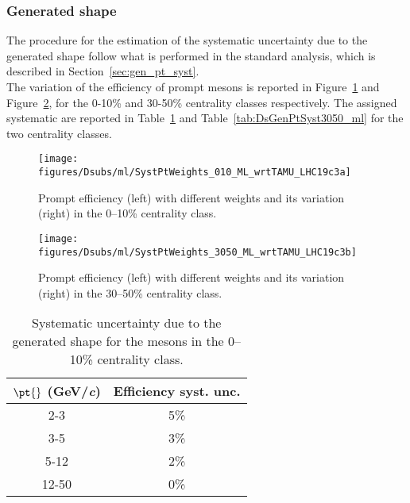 \subsubsection{Generated \pt{} shape}
The procedure for the estimation of the systematic uncertainty due to the generated \pt{} shape follow what is performed 
in the standard analysis, which is described in Section~\ref{sec:gen_pt_syst}. \\
The variation of the efficiency of prompt \Dsubs{} mesons is reported in Figure~\ref{fig:genpt_010} and Figure~\ref{fig:genpt_3050}, for the 0-10\% 
and 30-50\% centrality classes respectively.
The assigned systematic are reported in Table~\ref{tab:DsGenPtSyst010_ml} and Table~\ref{tab:DsGenPtSyst3050_ml} for the two centrality classes.
\begin{figure}[htbp]
  \begin{center}
   \texttt{[image: figures/Dsubs/ml/SystPtWeights\_010\_ML\_wrtTAMU\_LHC19c3a]}
  \caption{Prompt \Dsubs{} efficiency (left) with different \pt{} weights and its variation (right) in the 0--10\% centrality
           class.}
  \label{fig:genpt_010}
  \end{center}
\end{figure}
\begin{figure}[htbp]
  \begin{center}
   \texttt{[image: figures/Dsubs/ml/SystPtWeights\_3050\_ML\_wrtTAMU\_LHC19c3b]}
  \caption{Prompt \Dsubs{} efficiency (left) with different \pt{} weights and its variation (right) in the 30--50\% centrality
           class.}
  \label{fig:genpt_3050}
  \end{center}
\end{figure}
\begin{table}[htbp]
  \begin{center}
   \begin{tabular}{|c|c|}
    \hline
    \textbf{$\mathbf{\pt{}}$ (GeV/\textit{c})} & \textbf{Efficiency syst. unc.} \\
    \hline
    2-3 & 5\%\\
    \hline
    3-5 & 3\%\\
    \hline
    5-12 & 2\%\\
    \hline
    12-50 & 0\%\\
    \hline
   \end{tabular}
  \end{center}
  \caption{Systematic uncertainty due to the generated \pt{} shape for the \Dsubs{} mesons in the 0--10\% centrality class.}
  \label{tab:DsGenPtSyst010_ml}
\end{table}
